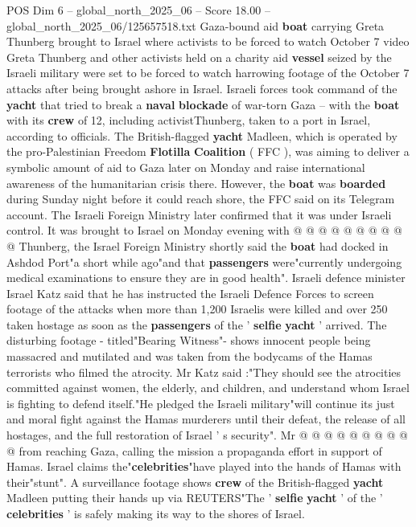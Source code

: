 \begin{textsample}{POS Dim 6 – global\_north\_2025\_06 – Score 18.00 – global\_north\_2025\_06/125657518.txt}  \label{ex:f6_pos_027}
Gaza-bound aid \textbf{boat} carrying Greta Thunberg brought to Israel where activists to be forced to watch October 7 video Greta Thunberg and other activists held on a charity aid \textbf{vessel} seized by the Israeli military were set to be forced to watch harrowing footage of the October 7 attacks after being brought ashore in Israel.
Israeli forces took command of the \textbf{yacht} that tried to break a \textbf{naval} \textbf{blockade} of war-torn Gaza -- with the \textbf{boat} with its \textbf{crew} of 12, including activistThunberg, taken to a port in Israel, according to officials.
The British-flagged \textbf{yacht} Madleen, which is operated by the pro-Palestinian Freedom \textbf{Flotilla} \textbf{Coalition} ( FFC ), was aiming to deliver a symbolic amount of aid to Gaza later on Monday and raise international awareness of the humanitarian crisis there.
However, the \textbf{boat} was \textbf{boarded} during Sunday night before it could reach shore, the FFC said on its Telegram account.
The Israeli Foreign Ministry later confirmed that it was under Israeli control.
It was brought to Israel on Monday evening with @ @ @ @ @ @ @ @ @ @ Thunberg, the Israel Foreign Ministry shortly said the \textbf{boat} had docked in Ashdod Port"a short while ago"and that \textbf{passengers} were"currently undergoing medical examinations to ensure they are in good health".
Israeli defence minister Israel Katz said that he has instructed the Israeli Defence Forces to screen footage of the attacks when more than 1,200 Israelis were killed and over 250 taken hostage as soon as the \textbf{passengers} of the ' \textbf{selfie} \textbf{yacht} ' arrived.
The disturbing footage - titled"Bearing Witness"- shows innocent people being massacred and mutilated and was taken from the bodycams of the Hamas terrorists who filmed the atrocity.
Mr Katz said :"They should see the atrocities committed against women, the elderly, and children, and understand whom Israel is fighting to defend itself."He pledged the Israeli military"will continue its just and moral fight against the Hamas murderers until their defeat, the release of all hostages, and the full restoration of Israel ' s security".
Mr @ @ @ @ @ @ @ @ @ @ from reaching Gaza, calling the mission a propaganda effort in support of Hamas.
Israel claims the"\textbf{celebrities}"have played into the hands of Hamas with their"stunt".
A surveillance footage shows \textbf{crew} of the British-flagged \textbf{yacht} Madleen putting their hands up via REUTERS"The ' \textbf{selfie} \textbf{yacht} ' of the ' \textbf{celebrities} ' is safely making its way to the shores of Israel.

\end{textsample}
